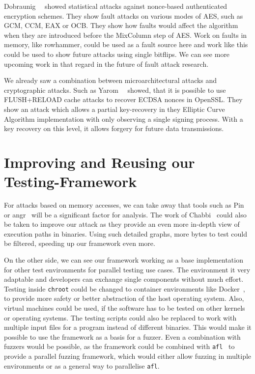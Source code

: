 Dobraunig~\etal~\cite{noncestat} showed statistical attacks against nonce-based
authenticated encryption schemes. They show fault attacks on various modes of
AES, such as GCM, CCM, EAX or OCB. They show how faults would affect the
algorithm when they are introduced before the MixColumn step of AES. Work on
faults in memory, like rowhammer, could be used as a fault source here and work
like this could be used to show future attacks using single bitflips. We can see
more upcoming work in that regard in the future of fault attack research.

We already saw a combination between microarchitectural attacks and
cryptographic attacks. Such as Yarom~\etal~\cite{noncerec} showed, that it is
possible to use FLUSH+RELOAD cache attacks to recover ECDSA nonces in OpenSSL.
They show an attack which allows a partial key-recovery in they Elliptic Curve
Algorithm implementation with only observing a single signing process. With a
key recovery on this level, it allows forgery for future data transmissions.

\section{Improving and Reusing our Testing-Framework}

For attacks based on memory accesses, we can take away that tools such as
Pin~\cite{pintool} or angr~\cite{angrpaper} will be a significant factor for
analysis. The work of Chabbi~\etal\cite{pincallpaths} could also be taken to
improve our attack as they provide an even more in-depth view of execution paths
in binaries. Using such detailed graphs, more bytes to test could be filtered,
speeding up our framework even more.

On the other side, we can see our framework working as a base implementation for
other test environments for parallel testing use cases. The environment it very
adaptable and developers can exchange single components without much effort.
Testing inside \texttt{chroot} could be changed to container environments like
Docker~\cite{docker}, to provide more safety or better abstraction of the host
operating system. Also, virtual machines could be used, if the software has to
be tested on other kernels or operating systems. The testing scripts could also
be replaced to work with multiple input files for a program instead of different
binaries. This would make it possible to use the framework as a basis for a
fuzzer. Even a combination with fuzzers would be possible, as the framework
could be combined with \texttt{afl}~\cite{aflweb} to provide a parallel fuzzing
framework, which would either allow fuzzing in multiple environments or as a
general way to parallelise \texttt{afl}.

